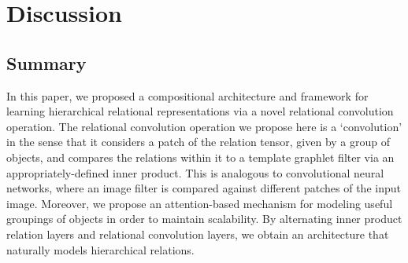 
\section{Discussion}\label{sec:discussion}
\subsection*{Summary}
In this paper, we proposed a compositional architecture and framework for learning hierarchical relational representations via a novel relational convolution operation. The relational convolution operation we propose here is a `convolution' in the sense that it considers a patch of the relation tensor, given by a group of objects, and compares the relations within it to a template graphlet filter via an appropriately-defined inner product. This is analogous to convolutional neural networks, where an image filter is compared against different patches of the input image. Moreover, we propose an attention-based mechanism for modeling useful groupings of objects in order to maintain scalability. By alternating inner product relation layers and relational convolution layers, we obtain an architecture that naturally models hierarchical relations.


